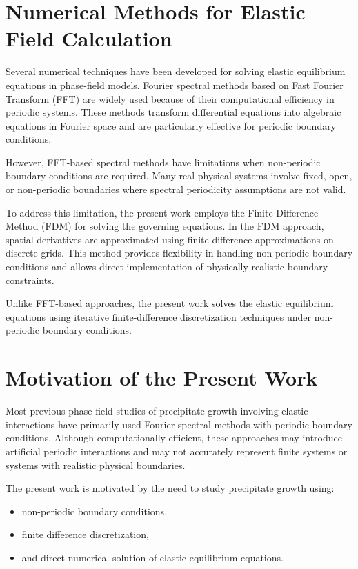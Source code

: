 \section{Numerical Methods for Elastic Field Calculation}

Several numerical techniques have been developed for solving elastic equilibrium equations in phase-field models. Fourier spectral methods based on Fast Fourier Transform (FFT) are widely used because of their computational efficiency in periodic systems. These methods transform differential equations into algebraic equations in Fourier space and are particularly effective for periodic boundary conditions.

However, FFT-based spectral methods have limitations when non-periodic boundary conditions are required. Many real physical systems involve fixed, open, or non-periodic boundaries where spectral periodicity assumptions are not valid.

To address this limitation, the present work employs the Finite Difference Method (FDM) for solving the governing equations. In the FDM approach, spatial derivatives are approximated using finite difference approximations on discrete grids. This method provides flexibility in handling non-periodic boundary conditions and allows direct implementation of physically realistic boundary constraints.

Unlike FFT-based approaches, the present work solves the elastic equilibrium equations using iterative finite-difference discretization techniques under non-periodic boundary conditions.

\section{Motivation of the Present Work}

Most previous phase-field studies of precipitate growth involving elastic interactions have primarily used Fourier spectral methods with periodic boundary conditions. Although computationally efficient, these approaches may introduce artificial periodic interactions and may not accurately represent finite systems or systems with realistic physical boundaries.

The present work is motivated by the need to study precipitate growth using:
\begin{itemize}
    \item non-periodic boundary conditions,
    \item finite difference discretization,
    \item and direct numerical solution of elastic equilibrium equations.
\end{itemize}

